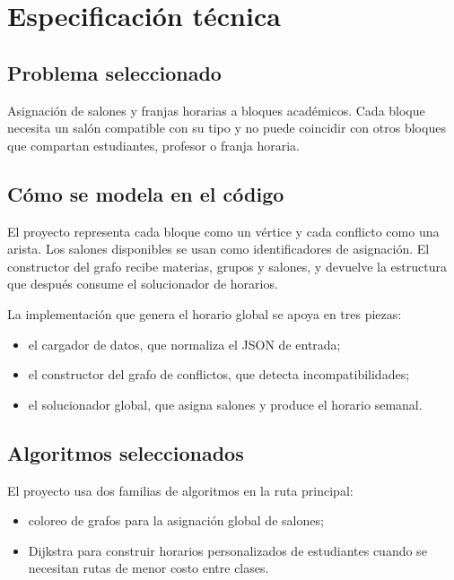 \chapter{Especificación técnica}

\section{Problema seleccionado}

Asignación de salones y franjas horarias a bloques académicos. Cada bloque necesita un salón compatible con su tipo y no puede coincidir con otros bloques que compartan estudiantes, profesor o franja horaria.

\section{Cómo se modela en el código}

El proyecto representa cada bloque como un vértice y cada conflicto como una arista. Los salones disponibles se usan como identificadores de asignación. El constructor del grafo recibe materias, grupos y salones, y devuelve la estructura que después consume el solucionador de horarios.

La implementación que genera el horario global se apoya en tres piezas:

\begin{itemize}[leftmargin=1.5cm]
  \item el cargador de datos, que normaliza el JSON de entrada;
  \item el constructor del grafo de conflictos, que detecta incompatibilidades;
  \item el solucionador global, que asigna salones y produce el horario semanal.
\end{itemize}

\section{Algoritmos seleccionados}

El proyecto usa dos familias de algoritmos en la ruta principal:

\begin{itemize}[leftmargin=1.5cm]
  \item coloreo de grafos para la asignación global de salones;
  \item Dijkstra para construir horarios personalizados de estudiantes cuando se necesitan rutas de menor costo entre clases.
\end{itemize}

